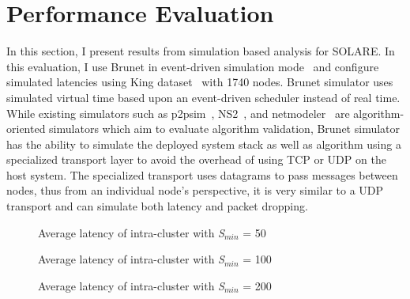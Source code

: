\section{Performance Evaluation}
\label{solare:evaluation}
In this section, I present results from simulation based analysis for
SOLARE.
%
In this evaluation, I use Brunet in event-driven simulation
mode~\cite{david} and
configure simulated latencies using King dataset~\cite{king} with 1740 nodes.
%
Brunet simulator uses simulated virtual time based upon an event-driven
scheduler instead of real time.
%
While existing simulators such as p2psim~\cite{p2psim}, NS2~\cite{ns2},
and netmodeler~\cite{netmodeler} are
algorithm-oriented simulators which aim to evaluate algorithm
validation, Brunet simulator has the ability to simulate the deployed
system stack as well as algorithm using a specialized transport layer to
avoid the overhead of using TCP or UDP on the host system.
%
The specialized transport uses datagrams to pass messages between nodes,
thus from an individual node's perspective, it is very similar to a UDP
transport and can simulate both latency and packet dropping.
%
\begin{figure}
\centering
{}
\caption{Average latency of intra-cluster with \textit{S$_{min}$} = 50}
\label{fig:latency50}
\end{figure}
%
\begin{figure}
\centering
{}
\caption{Average latency of intra-cluster with \textit{S$_{min}$} = 100}
\label{fig:latency100}
\end{figure}
%
\begin{figure}
\centering
{}
\caption{Average latency of intra-cluster with \textit{S$_{min}$} = 200}
\label{fig:latency200}
\end{figure}
%


